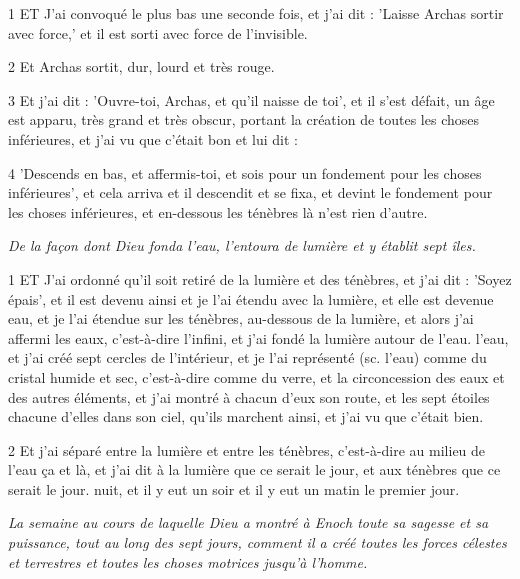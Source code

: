\par 1 ET J'ai convoqué le plus bas une seconde fois, et j'ai dit : 'Laisse Archas sortir avec force,' et il est sorti avec force de l'invisible.

\par 2 Et Archas sortit, dur, lourd et très rouge.

\par 3 Et j'ai dit : 'Ouvre-toi, Archas, et qu'il naisse de toi', et il s'est défait, un âge est apparu, très grand et très obscur, portant la création de toutes les choses inférieures, et j'ai vu que c'était bon et lui dit :

\par 4 'Descends en bas, et affermis-toi, et sois pour un fondement pour les choses inférieures', et cela arriva et il descendit et se fixa, et devint le fondement pour les choses inférieures, et en-dessous les ténèbres là n'est rien d'autre.




\par \textit{De la façon dont Dieu fonda l'eau, l'entoura de lumière et y établit sept îles.}

\par 1 ET J'ai ordonné qu'il soit retiré de la lumière et des ténèbres, et j'ai dit : 'Soyez épais', et il est devenu ainsi et je l'ai étendu avec la lumière, et elle est devenue eau, et je l'ai étendue sur les ténèbres, au-dessous de la lumière, et alors j'ai affermi les eaux, c'est-à-dire l'infini, et j'ai fondé la lumière autour de l'eau. l'eau, et j'ai créé sept cercles de l'intérieur, et je l'ai représenté (sc. l'eau) comme du cristal humide et sec, c'est-à-dire comme du verre, et la circoncession des eaux et des autres éléments, et j'ai montré à chacun d'eux son route, et les sept étoiles chacune d'elles dans son ciel, qu'ils marchent ainsi, et j'ai vu que c'était bien.

\par 2 Et j'ai séparé entre la lumière et entre les ténèbres, c'est-à-dire au milieu de l'eau ça et là, et j'ai dit à la lumière que ce serait le jour, et aux ténèbres que ce serait le jour. nuit, et il y eut un soir et il y eut un matin le premier jour.


\par \textit{La semaine au cours de laquelle Dieu a montré à Enoch toute sa sagesse et sa puissance, tout au long des sept jours, comment il a créé toutes les forces célestes et terrestres et toutes les choses motrices jusqu'à l'homme.}

